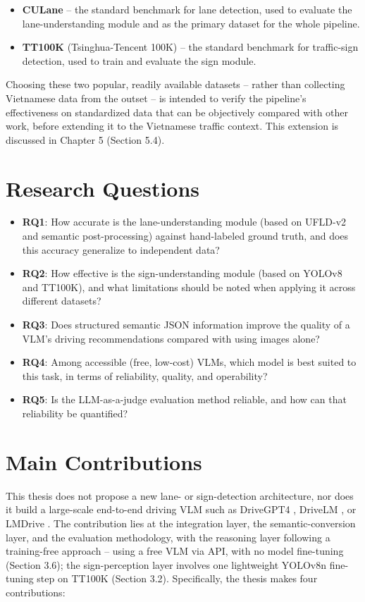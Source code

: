 \documentclass[12pt,a4paper]{report}
\begin{document}
\begin{itemize}
    \item \textbf{CULane} -- the standard benchmark for lane detection, used to evaluate the lane-understanding module and as the primary dataset for the whole pipeline.
    \item \textbf{TT100K} (Tsinghua-Tencent 100K) -- the standard benchmark for traffic-sign detection, used to train and evaluate the sign module.
\end{itemize}

Choosing these two popular, readily available datasets -- rather than collecting Vietnamese data from the outset -- is intended to verify the pipeline's effectiveness on standardized data that can be objectively compared with other work, before extending it to the Vietnamese traffic context. This extension is discussed in Chapter 5 (Section 5.4).

\section{Research Questions}

\begin{itemize}
    \item \textbf{RQ1}: How accurate is the lane-understanding module (based on UFLD-v2 and semantic post-processing) against hand-labeled ground truth, and does this accuracy generalize to independent data?
    \item \textbf{RQ2}: How effective is the sign-understanding module (based on YOLOv8 and TT100K), and what limitations should be noted when applying it across different datasets?
    \item \textbf{RQ3}: Does structured semantic JSON information improve the quality of a VLM's driving recommendations compared with using images alone?
    \item \textbf{RQ4}: Among accessible (free, low-cost) VLMs, which model is best suited to this task, in terms of reliability, quality, and operability?
    \item \textbf{RQ5}: Is the LLM-as-a-judge evaluation method reliable, and how can that reliability be quantified?
\end{itemize}

\section{Main Contributions}

This thesis does not propose a new lane- or sign-detection architecture, nor does it build a large-scale end-to-end driving VLM such as DriveGPT4 \cite{xu2024drivegpt4}, DriveLM \cite{sima2024drivelm}, or LMDrive \cite{shao2024lmdrive}. The contribution lies at the integration layer, the semantic-conversion layer, and the evaluation methodology, with the reasoning layer following a training-free approach -- using a free VLM via API, with no model fine-tuning (Section 3.6); the sign-perception layer involves one lightweight YOLOv8n fine-tuning step on TT100K (Section 3.2). Specifically, the thesis makes four contributions:
\end{document}
